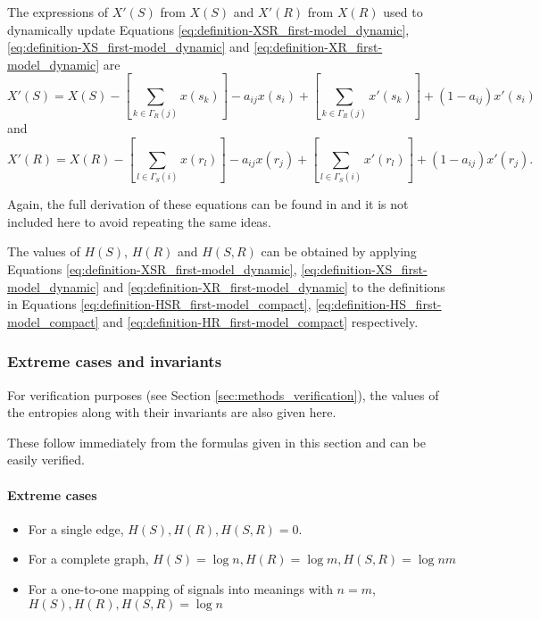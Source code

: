 The expressions of $X'(S)$ from $X(S)$ and $X'(R)$ from $X(R)$ used to dynamically update Equations \eqref{eq:definition-XSR_first-model_dynamic}, \eqref{eq:definition-XS_first-model_dynamic} and \eqref{eq:definition-XR_first-model_dynamic} are
\begin{equation}
  \label{eq:definition-XS_first-model_dynamic}
  X'(S) = X(S) - \left[ \sum_{k \in \Gamma_{R}(j)} x(s_k) \right] - a_{ij} x(s_i) + \left[ \sum_{k \in \Gamma_{R}(j)} x'(s_k) \right] + (1 - a_{ij}) x'(s_i)
\end{equation}
and
\begin{equation}
  \label{eq:definition-XR_first-model_dynamic}
  X'(R) = X(R) - \left[ \sum_{l \in \Gamma_{S}(i)} x(r_l) \right] - a_{ij} x(r_j) + \left[ \sum_{l \in \Gamma_{S}(i)} x'(r_l) \right] + (1 - a_{ij}) x'(r_j).
\end{equation}

Again, the full derivation of these equations can be found in \cite{Carrera2021a} and it is not included here to avoid repeating the same ideas.

The values of $H(S)$, $H(R)$ and $H(S,R)$ can be obtained by applying Equations \eqref{eq:definition-XSR_first-model_dynamic}, \eqref{eq:definition-XS_first-model_dynamic} and \eqref{eq:definition-XR_first-model_dynamic} to the definitions in Equations \eqref{eq:definition-HSR_first-model_compact}, \eqref{eq:definition-HS_first-model_compact} and \eqref{eq:definition-HR_first-model_compact} respectively.

\subsubsection{Extreme cases and invariants}
\label{sec:model_math_first-model_invariant}

For verification purposes (see Section \ref{sec:methods_verification}), the values of the entropies along with their invariants are also given here.

These follow immediately from the formulas given in this section and can be easily verified.

\paragraph{Extreme cases}
\begin{itemize}
\item For a single edge, $H(S), H(R), H(S,R) = 0$.
\item For a complete graph, $H(S) = \log n, H(R) = \log m, H(S,R) = \log nm $
\item For a one-to-one mapping of signals into meanings with $n=m$, $H(S), H(R), H(S,R) = \log n$
\end{itemize}

